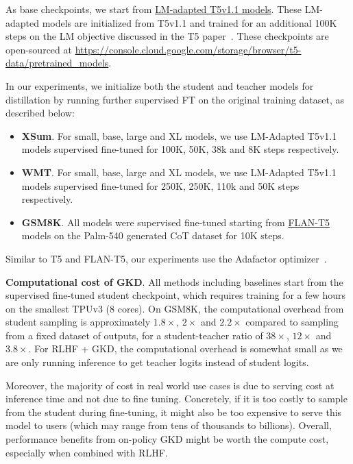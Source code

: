 \documentclass{article} %
\newcommand{\addtext}[1]{#1}
\begin{document}
As base checkpoints, we start from \href{https://github.com/google-research/text-to-text-transfer-transformer/blob/main/released\_checkpoints.md#lm-adapted-t511lm100k}{LM-adapted T5v1.1 models}.  These LM-adapted models are initialized from T5v1.1 and trained for an additional 100K steps on the LM objective discussed in the T5 paper~\citep{raffel2020exploring}.  These checkpoints are open-sourced at \url{https://console.cloud.google.com/storage/browser/t5-data/pretrained_models}. 



In our experiments, we initialize both the student and teacher models for distillation by running further supervised FT on the original training dataset, as described below: 

\begin{itemize}
    \item \textbf{XSum}. For small, base, large and XL models, we use LM-Adapted T5v1.1 models supervised fine-tuned for 100K, 50K, 38k and 8K steps respectively. 
    \item \textbf{WMT}. For small, base, large and XL models, we use LM-Adapted T5v1.1 models supervised fine-tuned for 250K, 250K, 110k and 50K steps respectively.
    \item \textbf{GSM8K}. All models were supervised fine-tuned starting from \href{https://github.com/google-research/t5x/blob/main/docs/models.md#flan-t5-checkpoints}{FLAN-T5} models on the Palm-540 generated CoT dataset for 10K steps. 
\end{itemize}


Similar to T5 and FLAN-T5, our experiments use the Adafactor optimizer~\citep{shazeer2018adafactor}.

\addtext{
\textbf{Computational cost of GKD}. All methods including baselines start from the supervised fine-tuned student checkpoint, which requires training for a few hours on the smallest TPUv3 (8 cores). On GSM8K, the computational overhead from student sampling is approximately $1.8\times$, $2\times$ and $2.2\times$ compared to sampling from a fixed dataset of outputs, for a student-teacher ratio of $38\times$, $12\times$ and $3.8\times$. For RLHF + GKD, the computational overhead is somewhat small as we are only running inference to get teacher logits instead of student logits. 


Moreover, the majority of cost in real world use cases is due to serving cost at inference time and not due to fine tuning. Concretely, if it is too costly to sample from the student during fine-tuning, it might also be too expensive to serve this model to users (which may range from tens of thousands to billions). Overall, performance benefits from on-policy GKD might be worth the compute cost, especially when combined with RLHF. }
\end{document}
